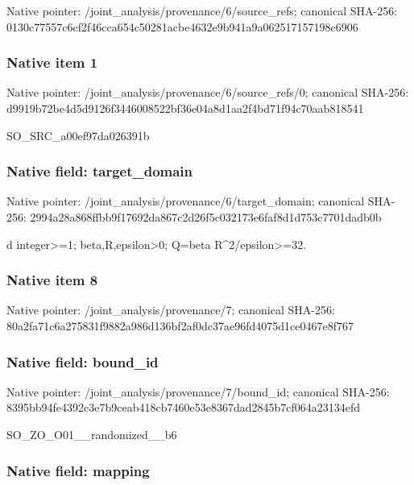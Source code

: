 \documentclass[10pt,a4paper]{article}
\begin{document}
Native pointer: /joint\_analysis/provenan\allowbreak{}ce/6/source\_refs; canonical SHA-256: 0130c77557c6cf2f46cca654\allowbreak{}c50281acbe4632e9b941a9a0\allowbreak{}62517157198c6906



\subsubsection{Native item 1}


Native pointer: /joint\_analysis/provenan\allowbreak{}ce/6/source\_refs/0; canonical SHA-256: d9919b72be4d5d9126f34460\allowbreak{}08522bf36e04a8d1aa2f4bd7\allowbreak{}1f94c70aab818541


SO\_SRC\_a00ef97da026391b


\subsubsection{Native field: target\_domain}


Native pointer: /joint\_analysis/provenan\allowbreak{}ce/6/target\_domain; canonical SHA-256: 2994a28a868ffbb9f17692da\allowbreak{}867c2d26f5c032173e6faf8d\allowbreak{}1d753c7701dadb0b


d integer>=1; beta,R,epsilon>0; Q=beta R\textasciicircum{}2/epsilon>=32.


\subsubsection{Native item 8}


Native pointer: /joint\_analysis/provenance/7; canonical SHA-256: 80a2fa71c6a275831f9882a9\allowbreak{}86d136bf2af0dc37ae96fd40\allowbreak{}75d1ce0467e8f767



\subsubsection{Native field: bound\_id}


Native pointer: /joint\_analysis/provenance/7/bound\_id; canonical SHA-256: 8395bb94fe4392c3e7b9ceab\allowbreak{}418cb7460e53e8367dad2845\allowbreak{}b7cf064a23134efd


SO\_ZO\_O01\_\_randomized\_\_b6


\subsubsection{Native field: mapping}
\end{document}
